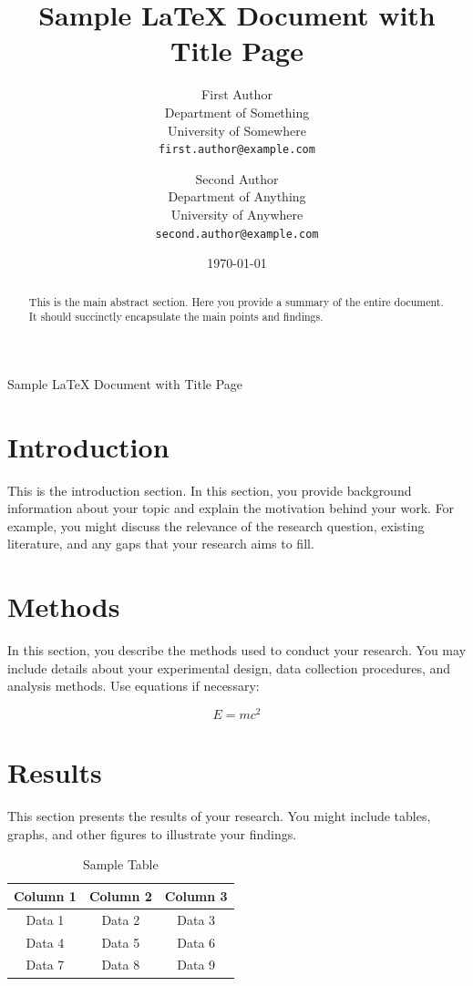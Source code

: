 \documentclass[12pt]{article}  %
\title{Sample LaTeX Document with Title Page}
\author{First Author \\ Department of Something \\ University of Somewhere \\ \texttt{first.author@example.com}
\and Second Author \\ Department of Anything \\ University of Anywhere \\ \texttt{second.author@example.com}}
\date{\today}  %
\begin{document}
\begin{titlepage}
    \centering
    \vspace*{2cm}  %

    {\Huge Sample LaTeX Document with Title Page}\\[1.5cm]  %

    
\end{titlepage}

\maketitle  %

\begin{abstract}
This is the main abstract section. Here you provide a summary of the entire document. It should succinctly encapsulate the main points and findings.
\end{abstract}

\section{Introduction}
\label{sec:introduction}
This is the introduction section. In this section, you provide background information about your topic and explain the motivation behind your work. For example, you might discuss the relevance of the research question, existing literature, and any gaps that your research aims to fill.

\section{Methods}
\label{sec:methods}
In this section, you describe the methods used to conduct your research. You may include details about your experimental design, data collection procedures, and analysis methods. Use equations if necessary:

\begin{equation}
E = mc^2
\end{equation}

\section{Results}
\label{sec:results}
This section presents the results of your research. You might include tables, graphs, and other figures to illustrate your findings. 

\begin{table}[h]
\centering
\caption{Sample Table}
\begin{tabular}{|c|c|c|}
\hline
Column 1 & Column 2 & Column 3 \\
\hline
Data 1 & Data 2 & Data 3 \\
Data 4 & Data 5 & Data 6 \\
Data 7 & Data 8 & Data 9 \\
\hline
\end{tabular}
\end{table}
\end{document}
